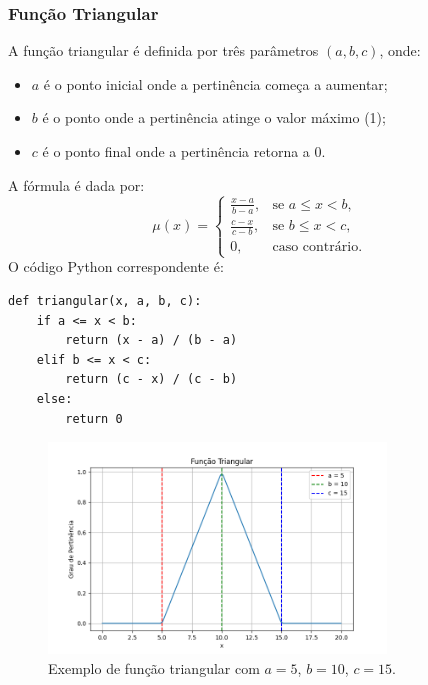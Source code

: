 \documentclass[a4paper,12pt]{article}
\begin{document}
\subsubsection{Função Triangular}
A função triangular é definida por três parâmetros $(a, b, c)$, onde:
\begin{itemize}
    \item $a$ é o ponto inicial onde a pertinência começa a aumentar;
    \item $b$ é o ponto onde a pertinência atinge o valor máximo (1);
    \item $c$ é o ponto final onde a pertinência retorna a 0.
\end{itemize}
A fórmula é dada por:
\[
\mu(x) =
\begin{cases}
\frac{x - a}{b - a}, & \text{se } a \leq x < b, \\
\frac{c - x}{c - b}, & \text{se } b \leq x < c, \\
0, & \text{caso contrário.}
\end{cases}
\]
O código Python correspondente é:
\begin{verbatim}
def triangular(x, a, b, c):
    if a <= x < b:
        return (x - a) / (b - a)
    elif b <= x < c:
        return (c - x) / (c - b)
    else:
        return 0
\end{verbatim}
\begin{figure}[H]
    \centering
    \includegraphics[width=0.8\textwidth]{img/triangular.png}
    \caption{Exemplo de função triangular com $a=5$, $b=10$, $c=15$.}
\end{figure}
\end{document}
